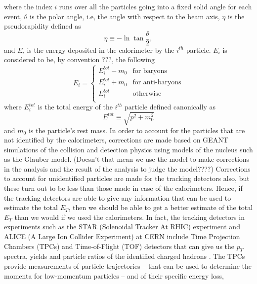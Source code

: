 where the index $i$ runs over all the particles going into a fixed solid angle for each event, $\theta$ is the polar angle, i.e, the angle with respect to the beam axis, $\eta$ is the pseudorapidity defined as 
\begin{equation}\label{eqn:pseudorap}
\eta\equiv-\ln\tan{\frac{\theta}{2}},
\end{equation}
and $E_{i}$ is the energy deposited in the calorimeter by the $i^{th}$ particle. $E_{i}$ is considered to be, by convention \cite{PhysRevC.89.044905}???, the following
\begin{equation}\label{eqn:EiCaseByCase}
E_{i} = 
	\begin{cases}
	E_{i}^{tot}-m_{0} & \text{for baryons} \\
	E_{i}^{tot}+m_{0} & \text{for anti-baryons} \\	
	E_{i}^{tot} & \text{otherwise} \\
	\end{cases}
\end{equation}
where $E_{i}^{tot}$ is the total energy of the $i^{th}$ particle defined canonically as
\begin{equation}\label{eqn:Etot}
E^{tot}\equiv\sqrt{p^{2}+m_{0}^2}
\end{equation}
and  $m_{0}$ is the particle's rest mass.
In order to account for the particles that are not identified by the calorimeters, corrections are made based on GEANT simulations of the collision and detection physics using models of the nucleus such as the Glauber model. (Doesn't that mean we use the model to make corrections in the analysis and the result of the analysis to judge the model????)
Corrections to account for unidentified particles are made for the tracking detectors also, but these turn out to be less than those made in case of the calorimeters. Hence, if the tracking detectors are able to give any information that can be used to estimate the total $E_{T}$, then we should be able to get a better estimate of the total $E_{T}$ than we would if we used the calorimeters. In fact, the tracking detectors in experiments such as the STAR (Solenoidal Tracker At RHIC) experiment and ALICE (A Large Ion Collider Experiment) at CERN include Time Projection Chambers (TPCs) and Time-of-Flight (TOF) detectors that can give us the $p_{T}$ spectra, yields and particle ratios of the identified charged hadrons \cite{Preghenella:2011vy, PhysRevC.96.044904}. The TPCs provide measurements of particle trajectories -- that can be used to determine the momenta for low-momentum particles -- and of their specific energy loss, 
